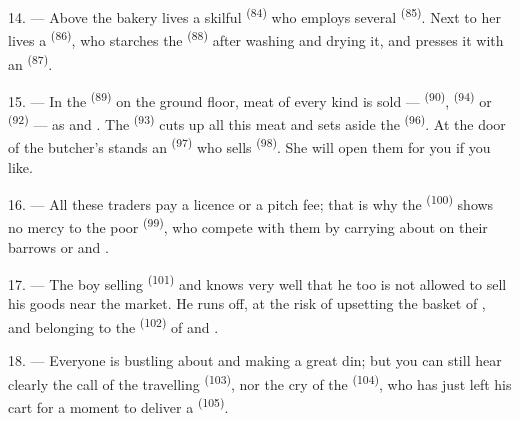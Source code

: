 14. --- Above the bakery lives a skilful  \textsuperscript{(84)} who
employs several  \textsuperscript{(85)}. Next to her lives a
 \textsuperscript{(86)}, who starches the 
\textsuperscript{(88)} after washing and drying it, and presses it with an
 \textsuperscript{(87)}.

\VUsaut{4.0mm}
\VUsaut{3.0mm}

15. --- In the  \textsuperscript{(89)} on the ground floor, meat of
every kind is sold ---  \textsuperscript{(90)}, 
\textsuperscript{(94)} or  \textsuperscript{(92)} --- as
 and . The 
\textsuperscript{(93)} cuts up all this meat and sets aside the 
\textsuperscript{(96)}. At the door of the butcher's stands an 
\textsuperscript{(97)} who sells  \textsuperscript{(98)}. She will open them
for you if you like.

16. --- All these traders pay a licence or a pitch fee; that is why the
 \textsuperscript{(100)} shows no mercy to the poor
 \textsuperscript{(99)}, who compete with them by
carrying about on their barrows  or
 and .

\VUsaut{4.0mm}
\VUsaut{3.0mm}

17. --- The boy selling  \textsuperscript{(101)} and  knows very
well that he too is not allowed to sell his goods near the market. He runs off, at the risk of
upsetting the basket of ,
 and  belonging to the 
\textsuperscript{(102)} of  and .

18. --- Everyone is bustling about and making a great din; but you can still hear clearly the
call of the travelling  \textsuperscript{(103)}, nor the cry of the
 \textsuperscript{(104)}, who has just left his cart for a moment to deliver a
 \textsuperscript{(105)}.
\VUsaut{6.0mm}
\VUfilet{22mm}
